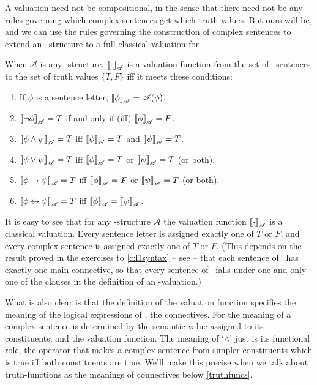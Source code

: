 A valuation need not be compositional, in the sense that there need not be any rules governing which complex sentences get which truth values. But ours will be, and we can use the rules governing the construction of complex sentences to extend an \lone\ structure to a full classical valuation for \lone.
\begin{definition}\label{value}
		When $\mathscr{A}$ is any \lone-structure, $\left\llbracket \cdot\right\rrbracket_{\mathscr{A}}$ is a valuation function from the set of \lone\ sentences to the set of truth values $\{T, F\}$ iff it meets these conditions: \begin{enumerate}
			\item If $\phi$ is a sentence letter, $\left\llbracket \phi\right\rrbracket_{\mathscr{A}} = \mathscr{A}(\phi)$.
			\item $\left\llbracket \neg \phi\right\rrbracket_{\mathscr{A}} = T$ if and only if (iff) $\left\llbracket \phi\right\rrbracket_{\mathscr{A}}= F$.
			\item $\left\llbracket \phi \wedge \psi\right\rrbracket_{\mathscr{A}} = T$ iff $\left\llbracket \phi\right\rrbracket_{\mathscr{A}}=T$ and $\left\llbracket \psi\right\rrbracket_{\mathscr{A}}=T$.
			\item $\left\llbracket \phi \vee \psi\right\rrbracket_{\mathscr{A}} = T$ iff $\left\llbracket \phi\right\rrbracket_{\mathscr{A}}=T$ or $\left\llbracket \psi\right\rrbracket_{\mathscr{A}}=T$ (or both).
			\item $\left\llbracket \phi \to \psi\right\rrbracket_{\mathscr{A}} = T$ iff $\left\llbracket \phi\right\rrbracket_{\mathscr{A}}=F$ or $\left\llbracket \psi\right\rrbracket_{\mathscr{A}}=T$ (or both).
			\item $\left\llbracket \phi \leftrightarrow \psi\right\rrbracket_{\mathscr{A}} = T$ iff $\left\llbracket \phi\right\rrbracket_{\mathscr{A}}=\left\llbracket \psi\right\rrbracket_{\mathscr{A}}$.
		\end{enumerate}
	\end{definition} It is easy to see that for any \lone-structure $\mathscr{A}$ the valuation function $\left\llbracket \cdot\right\rrbracket_{\mathscr{A}}$ is a classical valuation. Every sentence letter is assigned exactly one of $T$ or $F$, and every complex sentence is assigned exactly one of $T$ or $F$. (This depends on the result proved in the exercises to \autoref{c:l1syntax} – see \pageref{ans:l1syntax} – that each sentence of \lone\ has exactly one main connective, so that every sentence of \lone\ falls under one and only one of the clauses in the definition of an \lone-valuation.)

What is also clear is that the definition of the valuation function specifies the meaning of the logical expressions of \lone, the connectives. For the meaning of a complex sentence is determined by the semantic value assigned to its constituents, and the valuation function. The meaning of `$\wedge$' just is its functional role, the operator that makes a complex sentence from simpler constituents which is true iff both constituents are true. We'll make this precise when we talk about truth-functions as the meanings of connectives below \autoref{truthfuncs}.

